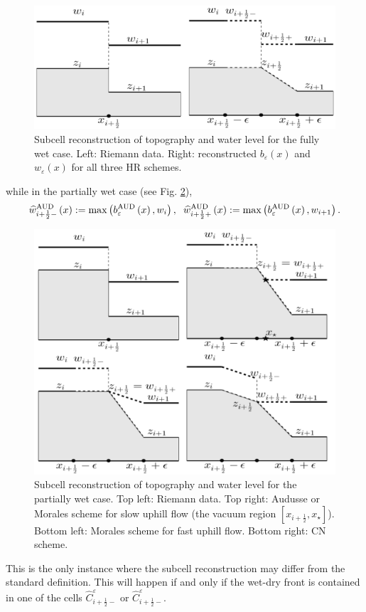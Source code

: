 \documentclass[11pt,a4paper,center,notitlepage]{article}
\numberwithin{equation}{section}
\begin{document}
\begin{figure}[H]
\centering
\includegraphics[scale=0.35]{2}
\caption{Subcell reconstruction of topography and water level for the fully wet case. Left: Riemann data. Right: reconstructed $b_\varepsilon\left(x\right)$ and $w_\varepsilon \left(x\right)$ for all three HR schemes.}
\label{fig2}
\end{figure}
while in the partially wet case (see Fig. \ref{fig3}), 
\begin{align}
\widehat w_{i + \frac{1}{2} - }^{\rm AUD}\left( x \right): = \max \left( {b_\varepsilon ^{\rm AUD}\left( x \right),{w_i}} \right), \hspace{2mm} \widehat w_{i + \frac{1}{2} + }^{\rm AUD}\left( x \right): = \max \left( {b_\varepsilon ^{\rm AUD}\left( x \right),{w_{i + 1}}} \right).
\end{align}
\begin{figure}[H]
\centering
\includegraphics[scale=0.5]{3}
\caption{Subcell reconstruction of topography and water level for the partially wet case. Top left: Riemann data. Top right: Audusse or Morales scheme for slow uphill flow (the vacuum region $\left[x_{i+\frac{1}{2}},x_\star \right]$). Bottom left: Morales scheme for fast uphill flow. Bottom right: CN scheme.}
\label{fig3}
\end{figure}
This is the only instance where the subcell reconstruction may differ from the standard definition. This will happen if and only if the wet-dry front is contained in one of the cells $\widehat C_{i + \frac{1}{2} - }^\varepsilon$ or $\widehat C_{i + \frac{1}{2} - }^\varepsilon$. 
\end{document}
